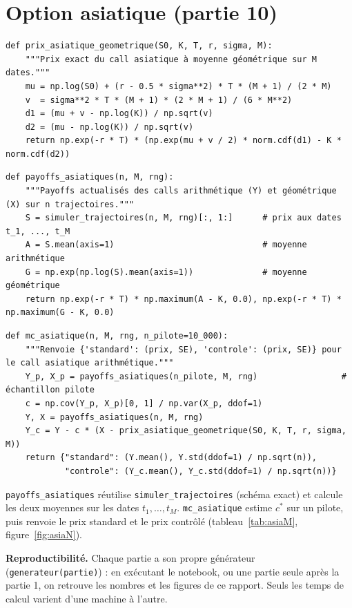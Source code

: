 \section*{Option asiatique (partie 10)}
\begin{lstlisting}
def prix_asiatique_geometrique(S0, K, T, r, sigma, M):
    """Prix exact du call asiatique à moyenne géométrique sur M dates."""
    mu = np.log(S0) + (r - 0.5 * sigma**2) * T * (M + 1) / (2 * M)
    v  = sigma**2 * T * (M + 1) * (2 * M + 1) / (6 * M**2)
    d1 = (mu + v - np.log(K)) / np.sqrt(v)
    d2 = (mu - np.log(K)) / np.sqrt(v)
    return np.exp(-r * T) * (np.exp(mu + v / 2) * norm.cdf(d1) - K * norm.cdf(d2))
\end{lstlisting}
\begin{lstlisting}
def payoffs_asiatiques(n, M, rng):
    """Payoffs actualisés des calls arithmétique (Y) et géométrique (X) sur n trajectoires."""
    S = simuler_trajectoires(n, M, rng)[:, 1:]      # prix aux dates t_1, ..., t_M
    A = S.mean(axis=1)                              # moyenne arithmétique
    G = np.exp(np.log(S).mean(axis=1))              # moyenne géométrique
    return np.exp(-r * T) * np.maximum(A - K, 0.0), np.exp(-r * T) * np.maximum(G - K, 0.0)
\end{lstlisting}
\begin{lstlisting}
def mc_asiatique(n, M, rng, n_pilote=10_000):
    """Renvoie {'standard': (prix, SE), 'controle': (prix, SE)} pour le call asiatique arithmétique."""
    Y_p, X_p = payoffs_asiatiques(n_pilote, M, rng)                 # échantillon pilote
    c = np.cov(Y_p, X_p)[0, 1] / np.var(X_p, ddof=1)
    Y, X = payoffs_asiatiques(n, M, rng)
    Y_c = Y - c * (X - prix_asiatique_geometrique(S0, K, T, r, sigma, M))
    return {"standard": (Y.mean(), Y.std(ddof=1) / np.sqrt(n)),
            "controle": (Y_c.mean(), Y_c.std(ddof=1) / np.sqrt(n))}
\end{lstlisting}
\texttt{payoffs\_asiatiques} réutilise \texttt{simuler\_trajectoires} (schéma exact) et calcule les deux moyennes sur les dates $t_1,\dots,t_M$. \texttt{mc\_asiatique} estime $c^*$ sur un pilote, puis renvoie le prix standard et le prix contrôlé (tableau~\ref{tab:asiaM}, figure~\ref{fig:asiaN}).

\begin{retenir}
\textbf{Reproductibilité.} Chaque partie a son propre générateur (\texttt{generateur(partie)}) : en exécutant le notebook, ou une partie seule après la partie 1, on retrouve les nombres et les figures de ce rapport. Seuls les temps de calcul varient d'une machine à l'autre.
\end{retenir}
